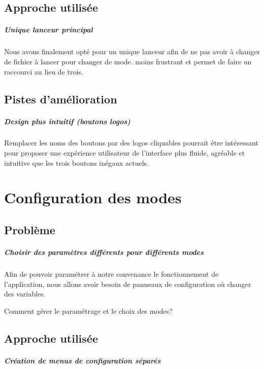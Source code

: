 \documentclass{scrreprt}
\begin{document}
		\section{Approche utilisée}
			\paragraph{Unique lanceur principal}
			
			Nous avons finalement opté pour un unique lanceur afin de ne pas avoir à changer de fichier à lancer pour changer de mode. moins frustrant et permet de faire un raccourci au lieu de trois.
			
		\section{Pistes d'amélioration}
			\paragraph{Design plus intuitif (boutons logos)}
			
			Remplacer les noms des boutons par des logos cliquables pourrait être intéressant pour proposer une expérience utilisateur de l'interface plus fluide, agréable et intuitive que les trois boutons inégaux actuels.
			
	
	\chapter{Configuration des modes}
		\section{Problème}
			\paragraph{Choisir des paramètres différents pour différents modes}
			
			Afin de pouvoir paramétrer à notre convenance le fonctionnement de l'application, nous allons avoir besoin de panneaux de configuration où changer des variables. 
			
			Comment gérer le paramétrage et le choix des modes?
			
			
		\section{Approche utilisée}
			\paragraph{Création de menus de configuration séparés}
			
\end{document}
